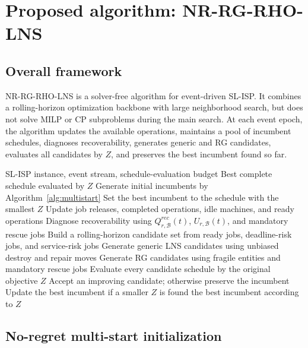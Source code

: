 \documentclass[a4paper,fleqn]{cas-sc}
\begin{document}
\section{Proposed algorithm: NR-RG-RHO-LNS}
\label{sec:algorithm}

\subsection{Overall framework}
\label{sec:algorithm_overall}

NR-RG-RHO-LNS is a solver-free algorithm for event-driven SL-ISP. It combines a rolling-horizon optimization backbone with large neighborhood search, but does not solve MILP or CP subproblems during the main search. At each event epoch, the algorithm updates the available operations, maintains a pool of incumbent schedules, diagnoses recoverability, generates generic and RG candidates, evaluates all candidates by \(Z\), and preserves the best incumbent found so far.

\begin{algorithm}[!t]
\caption{Overall NR-RG-RHO-LNS framework}
\label{alg:overall}
\begin{algorithmic}[1]
\Require SL-ISP instance, event stream, schedule-evaluation budget
\Ensure Best complete schedule evaluated by \(Z\)
\State Generate initial incumbents by Algorithm~\ref{alg:multistart}
\State Set the best incumbent to the schedule with the smallest \(Z\)
    \State Update job releases, completed operations, idle machines, and ready operations
    \State Diagnose recoverability using \(Q_{r,\mathcal B}^{rec}(t)\), \(U_{r,\mathcal B}(t)\), and mandatory rescue jobs
    \State Build a rolling-horizon candidate set from ready jobs, deadline-risk jobs, and service-risk jobs
        \State Generate generic LNS candidates using unbiased destroy and repair moves
        \State Generate RG candidates using fragile entities and mandatory rescue jobs
        \State Evaluate every candidate schedule by the original objective \(Z\)
        \State Accept an improving candidate; otherwise preserve the incumbent
        \State Update the best incumbent if a smaller \(Z\) is found
    \EndFor
\EndFor
\State \Return the best incumbent according to \(Z\)
\end{algorithmic}
\end{algorithm}

\subsection{No-regret multi-start initialization}
\label{sec:no_regret_initialization}
\end{document}
